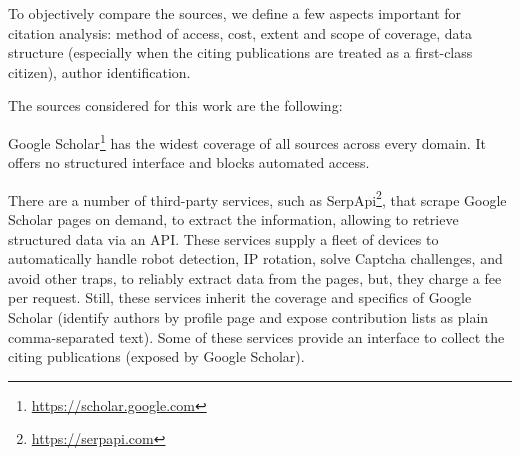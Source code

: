To objectively compare the sources, we define a few aspects important for citation analysis: method of access, cost, extent and scope of coverage, data structure (especially when the citing publications are treated as a first-class citizen), author identification.



The sources considered for this work are the following:

\begin{description}
    \item \textsf{Google Scholar}\footnote{\url{https://scholar.google.com}}
    has the widest coverage of all sources across every domain.
    It offers no structured interface and blocks automated access.

    There are a number of third-party services, such as \textsf{SerpApi}\footnote{\url{https://serpapi.com}}, that scrape \textsf{Google Scholar} pages on demand, to extract the information, allowing to retrieve structured data via an API.
    These services supply a fleet of devices to automatically handle robot detection, IP rotation, solve Captcha challenges, and avoid other traps, to reliably extract data from the pages, but, they charge a fee per request.
    Still, these services inherit the coverage and specifics of \textsf{Google Scholar} (identify authors by profile page and expose contribution lists as plain comma-separated text).
    Some of these services provide an interface to collect the citing publications (exposed by \textsf{Google Scholar}).


\end{description}
